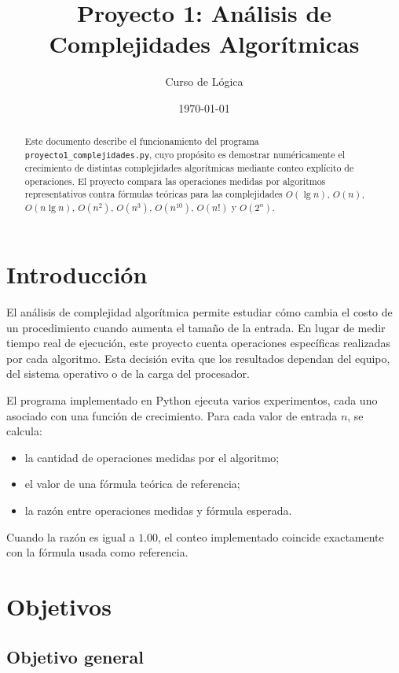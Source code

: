 \documentclass[12pt,letterpaper]{article}
\title{\textbf{Proyecto 1: Análisis de Complejidades Algorítmicas}}
\author{Curso de Lógica}
\date{\today}
\begin{document}
\maketitle

\begin{abstract}
Este documento describe el funcionamiento del programa \texttt{proyecto1\_complejidades.py}, cuyo propósito es demostrar numéricamente el crecimiento de distintas complejidades algorítmicas mediante conteo explícito de operaciones. El proyecto compara las operaciones medidas por algoritmos representativos contra fórmulas teóricas para las complejidades $O(\lg n)$, $O(n)$, $O(n\lg n)$, $O(n^2)$, $O(n^3)$, $O(n^{10})$, $O(n!)$ y $O(2^n)$.
\end{abstract}

\tableofcontents
\newpage

\section{Introducción}

El análisis de complejidad algorítmica permite estudiar cómo cambia el costo de un procedimiento cuando aumenta el tamaño de la entrada. En lugar de medir tiempo real de ejecución, este proyecto cuenta operaciones específicas realizadas por cada algoritmo. Esta decisión evita que los resultados dependan del equipo, del sistema operativo o de la carga del procesador.

El programa implementado en Python ejecuta varios experimentos, cada uno asociado con una función de crecimiento. Para cada valor de entrada $n$, se calcula:

\begin{itemize}
    \item la cantidad de operaciones medidas por el algoritmo;
    \item el valor de una fórmula teórica de referencia;
    \item la razón entre operaciones medidas y fórmula esperada.
\end{itemize}

Cuando la razón es igual a $1.00$, el conteo implementado coincide exactamente con la fórmula usada como referencia.

\section{Objetivos}

\subsection{Objetivo general}
\end{document}
